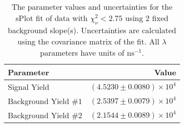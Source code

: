 
\begin{table}
    \begin{center}
        \begin{tabular}{lr}\toprule
            Parameter & Value \\\midrule
            Signal Yield & $(4.5230 \pm 0.0080) \times 10^{4}$ \\
            Background Yield $\#1$ & $(2.5397 \pm 0.0079) \times 10^{4}$ \\
            Background Yield $\#2$ & $(2.1544 \pm 0.0089) \times 10^{4}$ \\\bottomrule
        \end{tabular}
        \caption{The parameter values and uncertainties for the sPlot fit of data with $\chi^2_\nu < 2.75$ using 2 fixed background slope(s). Uncertainties are calculated using the covariance matrix of the fit. All $\lambda$ parameters have units of $\si{\nano\second}^{-1}$.}
    \end{center}
\end{table}
